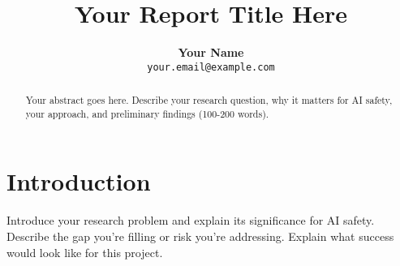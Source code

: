 \documentclass[midterm]{sparreport}
\title{Your Report Title Here}
\author{
  \textbf{Your Name}\\
  \texttt{your.email@example.com}
}
\begin{document}
\maketitle

\begin{abstract}
Your abstract goes here. Describe your research question, why it matters for AI safety, your approach, and preliminary findings (100-200 words).
\end{abstract}


\section{Introduction}

Introduce your research problem and explain its significance for AI safety. Describe the gap you're filling or risk you're addressing. Explain what success would look like for this project.

\end{document}
